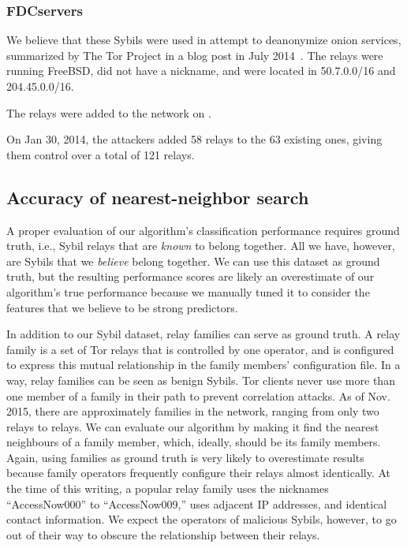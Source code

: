 \subsubsection{FDCservers}
\label{sec:fdcservers-sybils}
We believe that these Sybils were used in attempt to deanonymize onion services,
summarized by The Tor Project in a blog post in July 2014~\cite{cmucert}.
The relays were running FreeBSD, did not have a nickname, and were located in
50.7.0.0/16 and 204.45.0.0/16.

The relays were added to the network on .

On Jan 30, 2014, the attackers added 58 relays to the 63 existing ones, giving
them control over a total of 121 relays.

% 

\subsection{Accuracy of nearest-neighbor search}
\label{sec:accuracy}
A proper evaluation of our algorithm's classification performance requires
ground truth, i.e., Sybil relays that are \emph{known} to belong together.  All
we have, however, are Sybils that we \emph{believe} belong together.  We can use
this dataset as ground truth, but the resulting performance scores are likely an
overestimate of our algorithm's true performance because we manually tuned it to
consider the features that we believe to be strong predictors.

In addition to our Sybil dataset, relay families can serve as ground truth.  A
relay family is a set of Tor relays that is controlled by one operator, and is
configured to express this mutual relationship in the family members'
configuration file.  In a way, relay families can be seen as benign Sybils.  Tor
clients never use more than one member of a family in their path to prevent
correlation attacks.  As of Nov.  2015, there are approximately 
families in the network, ranging from only two relays to  relays.
We can evaluate our algorithm by making it find the nearest neighbours of a
family member, which, ideally, should be its family members.  Again, using
families as ground truth is very likely to overestimate results because family
operators frequently configure their relays almost identically.  At the time of
this writing, a popular relay family uses the nicknames ``AccessNow000'' to
``AccessNow009,'' uses adjacent IP addresses, and identical contact information.
We expect the operators of malicious Sybils, however, to go out of their way to
obscure the relationship between their relays.

